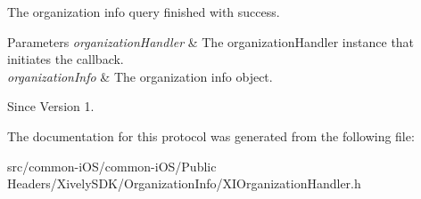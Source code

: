 The organization info query finished with success. 


\begin{DoxyParams}{Parameters}
{\em organization\+Handler} & The organization\+Handler instance that initiates the callback. \\
\hline
{\em organization\+Info} & The organization info object. \\
\hline
\end{DoxyParams}
\begin{DoxySince}{Since}
Version 1. 
\end{DoxySince}


The documentation for this protocol was generated from the following file\+:\begin{DoxyCompactItemize}
\item 
src/common-\/i\+O\+S/common-\/i\+O\+S/\+Public Headers/\+Xively\+S\+D\+K/\+Organization\+Info/X\+I\+Organization\+Handler.\+h\end{DoxyCompactItemize}
